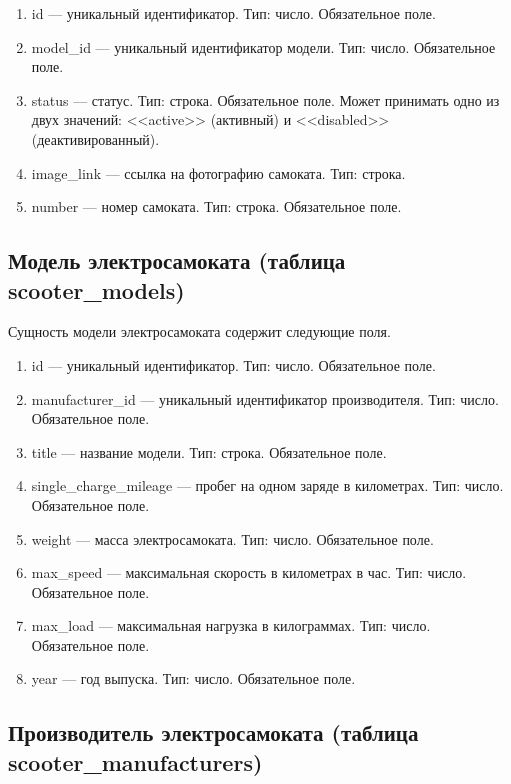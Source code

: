 \begin{enumerate}
    \item id --- уникальный идентификатор. Тип: число. Обязательное поле.
    \item model\_id --- уникальный идентификатор модели. Тип: число. Обязательное поле.
    \item status --- статус. Тип: строка. Обязательное поле. Может принимать одно из двух значений: <<active>> (активный) и <<disabled>> (деактивированный).
    \item image\_link --- ссылка на фотографию самоката. Тип: строка.
    \item number --- номер самоката. Тип: строка. Обязательное поле.
\end{enumerate}

\subsection{Модель электросамоката (таблица scooter\_models)}

Сущность модели электросамоката содержит следующие поля.

\begin{enumerate}
    \item id --- уникальный идентификатор. Тип: число. Обязательное поле.
    \item manufacturer\_id --- уникальный идентификатор производителя. Тип: число. Обязательное поле.
    \item title --- название модели. Тип: строка. Обязательное поле.
    \item single\_charge\_mileage --- пробег на одном заряде в километрах. Тип: число. Обязательное поле.
    \item weight --- масса электросамоката. Тип: число. Обязательное поле.
    \item max\_speed --- максимальная скорость в километрах в час. Тип: число. Обязательное поле.
    \item max\_load --- максимальная нагрузка в килограммах. Тип: число. Обязательное поле.
    \item year --- год выпуска. Тип: число. Обязательное поле.
\end{enumerate}

\subsection{Производитель электросамоката (таблица scooter\_manufacturers)}

